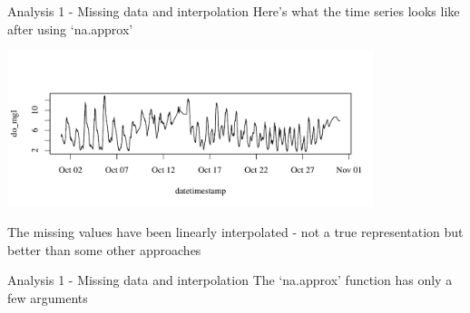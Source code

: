 \documentclass[xcolor=svgnames]{beamer}\usepackage[]{graphicx}\usepackage[]{color}
\newenvironment{knitrout}{}{} %
\newcommand{\Bigtxt}[1]{\textbf{\textit{#1}}}
\begin{document}
\begin{frame}[containsverbatim]{Analysis 1 - Missing data and interpolation}
Here's what the time series looks like after using `na.approx'
\begin{knitrout}\scriptsize
{}\color{fgcolor}

{\centering \includegraphics[width=0.8\textwidth]{figure/unnamed-chunk-12} 

}



\end{knitrout}
The missing values have been linearly interpolated - not a true representation but better than some other approaches
\end{frame}

\begin{frame}[containsverbatim]{Analysis 1 - Missing data and interpolation}
The `na.approx' function has only a few arguments
\end{frame}

\end{document}
